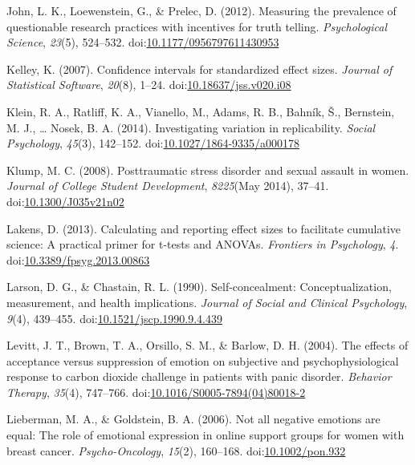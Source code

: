 \documentclass[man, mask]{apa6}
\theoremstyle{definition}
\theoremstyle{definition}
\theoremstyle{definition}
\theoremstyle{remark}
\begin{document}
\hypertarget{ref-John2012}{}
John, L. K., Loewenstein, G., \& Prelec, D. (2012). Measuring the
prevalence of questionable research practices with incentives for truth
telling. \emph{Psychological Science}, \emph{23}(5), 524--532.
doi:\href{https://doi.org/10.1177/0956797611430953}{10.1177/0956797611430953}

\hypertarget{ref-Kelley2007}{}
Kelley, K. (2007). Confidence intervals for standardized effect sizes.
\emph{Journal of Statistical Software}, \emph{20}(8), 1--24.
doi:\href{https://doi.org/10.18637/jss.v020.i08}{10.18637/jss.v020.i08}

\hypertarget{ref-Klein2014a}{}
Klein, R. A., Ratliff, K. A., Vianello, M., Adams, R. B., Bahník, Š.,
Bernstein, M. J., \ldots{} Nosek, B. A. (2014). Investigating variation
in replicability. \emph{Social Psychology}, \emph{45}(3), 142--152.
doi:\href{https://doi.org/10.1027/1864-9335/a000178}{10.1027/1864-9335/a000178}

\hypertarget{ref-Klump2008}{}
Klump, M. C. (2008). Posttraumatic stress disorder and sexual assault in
women. \emph{Journal of College Student Development}, \emph{8225}(May
2014), 37--41.
doi:\href{https://doi.org/10.1300/J035v21n02}{10.1300/J035v21n02}

\hypertarget{ref-Lakens2013}{}
Lakens, D. (2013). Calculating and reporting effect sizes to facilitate
cumulative science: A practical primer for t-tests and ANOVAs.
\emph{Frontiers in Psychology}, \emph{4}.
doi:\href{https://doi.org/10.3389/fpsyg.2013.00863}{10.3389/fpsyg.2013.00863}

\hypertarget{ref-Larson1990a}{}
Larson, D. G., \& Chastain, R. L. (1990). Self-concealment:
Conceptualization, measurement, and health implications. \emph{Journal
of Social and Clinical Psychology}, \emph{9}(4), 439--455.
doi:\href{https://doi.org/10.1521/jscp.1990.9.4.439}{10.1521/jscp.1990.9.4.439}

\hypertarget{ref-Levitt2004}{}
Levitt, J. T., Brown, T. A., Orsillo, S. M., \& Barlow, D. H. (2004).
The effects of acceptance versus suppression of emotion on subjective
and psychophysiological response to carbon dioxide challenge in patients
with panic disorder. \emph{Behavior Therapy}, \emph{35}(4), 747--766.
doi:\href{https://doi.org/10.1016/S0005-7894(04)80018-2}{10.1016/S0005-7894(04)80018-2}

\hypertarget{ref-Lieberman2006}{}
Lieberman, M. A., \& Goldstein, B. A. (2006). Not all negative emotions
are equal: The role of emotional expression in online support groups for
women with breast cancer. \emph{Psycho-Oncology}, \emph{15}(2),
160--168. doi:\href{https://doi.org/10.1002/pon.932}{10.1002/pon.932}
\end{document}
